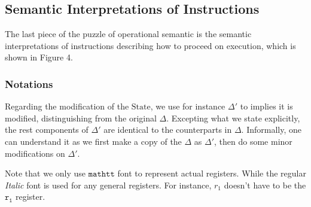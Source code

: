 \documentclass[a4paper]{article}
\newcommand*{\STATE}{\text{State}}
\begin{document}
\subsection{Semantic Interpretations of Instructions}

The last piece of the puzzle of operational semantic
is the semantic interpretations of instructions describing how to proceed on
execution, which is shown in Figure 4.

\subsubsection{Notations}
Regarding the modification of the $\STATE$, we use for instance $\Delta'$ to
implies it is modified, distinguishing from the original $\Delta$. Excepting
what we state explicitly, the rest components of $\Delta'$ are identical to the
counterparts in $\Delta$. Informally, one can understand it as we first make a
copy of the $\Delta$ as $\Delta'$, then do some minor modifications on
$\Delta'$.

Note that we only use $\mathtt{mathtt}$ font to represent actual registers.
While the regular \emph{Italic} font is used for any general registers. For
instance, $r_{1}$ doesn't have to be the $\mathtt{r_{1}}$ register.
\end{document}
